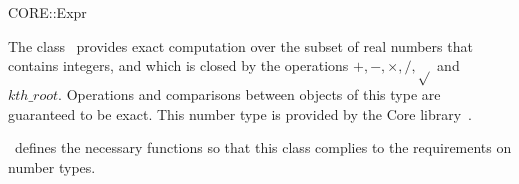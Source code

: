 \ccDefGlobalScope{}
\begin{ccRefClass}{CORE::Expr}

\ccDefinition

The class \ccRefName\ provides exact computation over the subset of real
numbers that contains integers, and which is closed by the operations
$+,-,\times,/,\sqrt{}$ and $kth\_root$.  Operations and comparisons 
between objects of this type are guaranteed to be exact.  
This number type is provided by the
{\sc Core} library~\cite{klpy-clp-99}.

\cgal\ defines the necessary functions so that this class complies to the
requirements on number types.


\ccIsModel
{}\\
\\

\end{ccRefClass}
